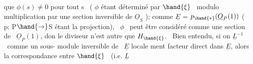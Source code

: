  que $\phi(s) \neq 0$ pour tout s \ ( $\phi$ étant déterminé par $\hand{\xi}$ \ modulo
multiplication par une section inversible de $\underline{O}_S$ ); comme $\underline{E}$ = $p_{\hand{*}}(\underline{O}_P(1))$
( p: P$\hand{\to}$S étant la projection), \ $\phi$ \ peut être considéré comme une section
de \ $\underline{O}_P(1)$, don le diviseur n'est autre que $H_{\hand{\xi}}$. \ Bien entendu, si on
 $\underline{L}^{-1}$ \ comme un sous- module inversible de \ $\underline{E}$ locale
ment facteur direct dans $\underline{E}$, alors la correspondance entre $\hand{\xi}$ \ (i.e. $\underline{L}$ \hand{\unsure{$\xi$,}}

